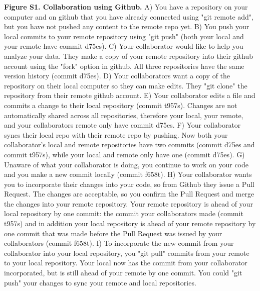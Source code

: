 \textbf{Figure S1. Collaboration using Github.} A) You have a repository on your computer and on github that you have already connected using "git remote add", but you have not pushed any content to the remote repo yet. B) You push your local commits to your remote repository using "git push" (both your local and your remote have commit d75es). C) Your collaborator would like to help you analyze your data. They make a copy of your remote repository into their github account using the "fork" option in github. All three repositories have the same version history (commit d75es). D) Your collaborators want a copy of the repository on their local computer so they can make edits. They "git clone" the repository from their remote github account. E) Your collaborator edits a file and commits a change to their local repository (commit t957s). Changes are not automatically shared across all repositories, therefore your local, your remote, and your collaborators remote only have commit d75es. F) Your collaborator syncs their local repo with their remote repo by pushing. Now both your collaborator's local and remote repositories have two commits (commit d75es and commit t957s), while your local and remote only have one (commit d75es). G) Unaware of what your collaborator is doing, you continue to work on your code and you make a new commit locally (commit f658t). H) Your collaborator wants you to incorporate their changes into your code, so from Github they issue a Pull Request. The changes are acceptable, so you confirm the Pull Request and merge the changes into your remote repository. Your remote repository is ahead of your local repository by one commit: the commit your collaborators made (commit t957s) and in addition your local repository is ahead of your remote repository by one commit that was made before the Pull Request was issued by your collaborators (commit f658t). I) To incorporate the new commit from your collaborator into your local repository, you "git pull" commits from your remote to your local repository. Your local now has the commit from your collaborator incorporated, but is still ahead of your remote by one commit. You could "git push" your changes to sync your remote and local repositories. 